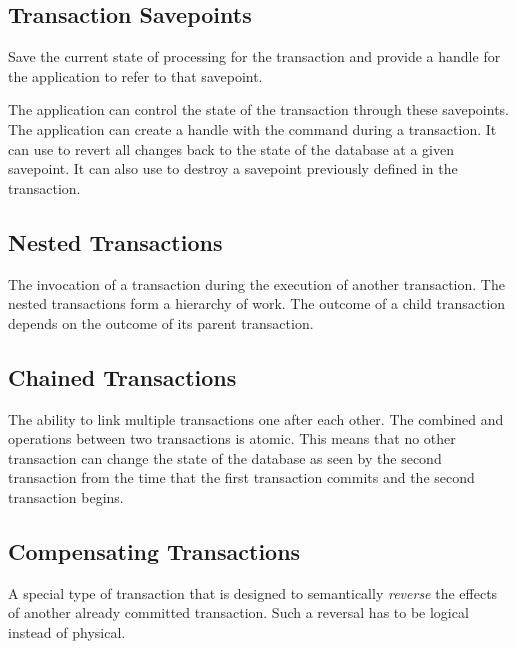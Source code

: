 \documentclass[11pt]{article}
\begin{document}
\subsection*{Transaction Savepoints}
Save the current state of processing for the transaction and provide a handle for the application 
to refer to that savepoint.

The application can control the state of the transaction through these savepoints. The application 
can create a handle with the  command during a transaction. It can use  
to revert all changes back to the state of the database at a given savepoint. It can also use 
 to destroy a savepoint previously defined in the transaction.
    
\subsection*{Nested Transactions}
The invocation of a transaction during the execution of another transaction. The nested transactions 
form a hierarchy of work. The outcome of a child transaction depends on the outcome of its parent 
transaction.

\subsection*{Chained Transactions}
The ability to link multiple transactions one after each other. 
The combined  and  operations between two transactions is atomic. This means 
that no other transaction can change the state of the database as seen by the second transaction 
from the time that the first transaction commits and the second transaction begins.
    
\subsection*{Compensating Transactions}
A special type of transaction that is designed to semantically \textit{reverse} the effects of 
another already committed transaction. Such a reversal has to be logical instead of physical.
\end{document}
